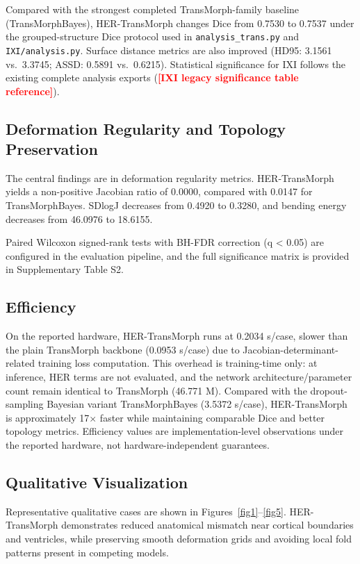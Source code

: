 \documentclass[jimaging,article,submit,pdftex,moreauthors]{Definitions/mdpi}
\providecommand{\PH}[1]{\textcolor{red}{\textbf{[#1]}}}
\begin{document}
Compared with the strongest completed TransMorph-family baseline (TransMorphBayes), HER-TransMorph changes Dice from 0.7530 to 0.7537 under the grouped-structure Dice protocol used in \texttt{analysis\_trans.py} and \texttt{IXI/analysis.py}. Surface distance metrics are also improved (HD95: 3.1561 vs.\ 3.3745; ASSD: 0.5891 vs.\ 0.6215). Statistical significance for IXI follows the existing complete analysis exports (\PH{IXI legacy significance table reference}).

\subsection{Deformation Regularity and Topology Preservation}
The central findings are in deformation regularity metrics. HER-TransMorph yields a non-positive Jacobian ratio of 0.0000, compared with 0.0147 for TransMorphBayes. SDlogJ decreases from 0.4920 to 0.3280, and bending energy decreases from 46.0976 to 18.6155.

Paired Wilcoxon signed-rank tests with BH-FDR correction (q < 0.05) are configured in the evaluation pipeline, and the full significance matrix is provided in Supplementary Table S2.

\subsection{Efficiency}
On the reported hardware, HER-TransMorph runs at 0.2034 s/case, slower than the plain TransMorph backbone (0.0953 s/case) due to Jacobian-determinant-related training loss computation. This overhead is training-time only: at inference, HER terms are not evaluated, and the network architecture/parameter count remain identical to TransMorph (46.771 M). Compared with the dropout-sampling Bayesian variant TransMorphBayes (3.5372 s/case), HER-TransMorph is approximately 17\(\times\) faster while maintaining comparable Dice and better topology metrics. Efficiency values are implementation-level observations under the reported hardware, not hardware-independent guarantees.

\subsection{Qualitative Visualization}
Representative qualitative cases are shown in Figures~\ref{fig1}--\ref{fig5}. HER-TransMorph demonstrates reduced anatomical mismatch near cortical boundaries and ventricles, while preserving smooth deformation grids and avoiding local fold patterns present in competing models.
\end{document}
